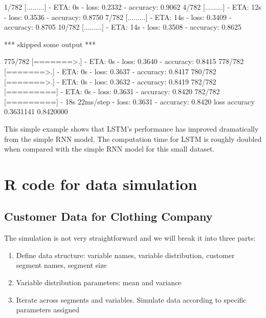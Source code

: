 \documentclass[12pt,]{krantz}
\makeatletter
\newenvironment{Shaded}{\begin{snugshade}}{\end{snugshade}}
\newcommand{\NormalTok}[1]{#1}
\providecommand{\tightlist}{%
  \setlength{\itemsep}{0pt}\setlength{\parskip}{0pt}}
\newenvironment{kframe}{%
\medskip{}
\setlength{\fboxsep}{.8em}
 \def\at@end@of@kframe{}%
 \ifinner\ifhmode%
  \def\at@end@of@kframe{\end{minipage}}%
  \begin{minipage}{\columnwidth}%
 \fi\fi%
 \def\FrameCommand##1{\hskip\@totalleftmargin \hskip-\fboxsep
 \colorbox{shadecolor}{##1}\hskip-\fboxsep
     \hskip-\linewidth \hskip-\@totalleftmargin \hskip\columnwidth}%
 \MakeFramed {\advance\hsize-\width
   \@totalleftmargin\z@ \linewidth\hsize
   \@setminipage}}%
 {\par\unskip\endMakeFramed%
 \at@end@of@kframe}
\renewenvironment{Shaded}{\begin{kframe}}{\end{kframe}}
\makeatother
\begin{document}
\begin{Shaded}
\begin{Highlighting}[]
\NormalTok{  1/782 [.........] - ETA: 0s  - loss: 0.2332 - accuracy: 0.9062}
\NormalTok{  4/782 [.........] - ETA: 12s - loss: 0.3536 - accuracy: 0.8750}
\NormalTok{  7/782 [.........] - ETA: 14s - loss: 0.3409 - accuracy: 0.8705}
\NormalTok{ 10/782 [.........] - ETA: 14s - loss: 0.3508 - accuracy: 0.8625}

\NormalTok{*** skipped some output ***}

\NormalTok{775/782 [=======>.] - ETA: 0s - loss: 0.3640 - accuracy: 0.8415}
\NormalTok{778/782 [=======>.] - ETA: 0s - loss: 0.3637 - accuracy: 0.8417}
\NormalTok{780/782 [=======>.] - ETA: 0s - loss: 0.3632 - accuracy: 0.8419}
\NormalTok{782/782 [=========] - ETA: 0s - loss: 0.3631 - accuracy: 0.8420}
\NormalTok{782/782 [=========] - 18s 22ms/step - loss: 0.3631 - accuracy: 0.8420}
\NormalTok{     loss  accuracy }
\NormalTok{0.3631141 0.8420000 }
\end{Highlighting}
\end{Shaded}

This simple example shows that LSTM's performance has improved dramatically from the simple RNN model. The computation time for LSTM is roughly doubled when compared with the simple RNN model for this small dataset.

\hypertarget{appendix-appendix}{%
\appendix {}}


\hypertarget{r-code-for-data-simulation}{%
\chapter{R code for data simulation}\label{r-code-for-data-simulation}}

\hypertarget{appendixdata1}{%
\section{Customer Data for Clothing Company}\label{appendixdata1}}

The simulation is not very straightforward and we will break it into three parts:

\begin{enumerate}
\def\labelenumi{\arabic{enumi}.}
\tightlist
\item
  Define data structure: variable names, variable distribution, customer segment names, segment size
\item
  Variable distribution parameters: mean and variance
\item
  Iterate across segments and variables. Simulate data according to specific parameters assigned
\end{enumerate}
\end{document}
